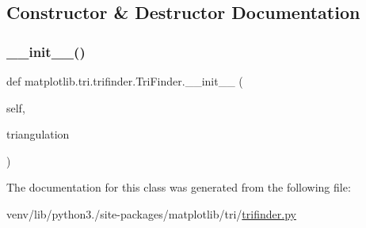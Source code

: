 \subsection{Constructor \& Destructor Documentation}
\mbox{\label{classmatplotlib_1_1tri_1_1trifinder_1_1TriFinder_a736c07de7f4868563bfa218fa84d344f}} 
\subsubsection{\texorpdfstring{\+\_\+\+\_\+init\+\_\+\+\_\+()}{\_\_init\_\_()}}
{\footnotesize\ttfamily def matplotlib.\+tri.\+trifinder.\+Tri\+Finder.\+\_\+\+\_\+init\+\_\+\+\_\+ (\begin{DoxyParamCaption}\item[{}]{self,  }\item[{}]{triangulation }\end{DoxyParamCaption})}



The documentation for this class was generated from the following file\+:\begin{DoxyCompactItemize}
\item 
venv/lib/python3./site-\/packages/matplotlib/tri/\hyperlink{trifinder_8py}{trifinder.\+py}\end{DoxyCompactItemize}
